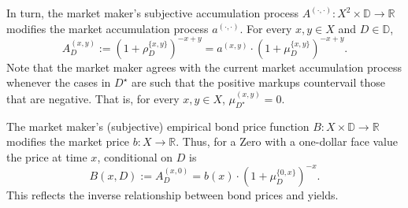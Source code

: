 \documentclass[ecta,nameyear,draft]{econsocart}
\newcommand{\R}{\mathbb R}
\newcommand{\mbbd}{{\mathds D}}
\newcommand{\past}{{D^\star}}
\newcommand{\xy}{{(x, y)}}
\newcommand{\dd}{{(\cdot,\cdot)}}
\theoremstyle{plain}
\theoremstyle{remark}
\begin{document}
In turn, the market maker's subjective accumulation process ${A^{\dd}}: X^2
\times \mbbd \rightarrow \R$ modifies the market accumulation process
$a^{\dd}$. For every $x, y \in X$ and $D \in\mbbd$,
\begin{equation*}
  {A}^{\xy}_{D} := \left(1 + \rho^{\{x,y\}}_{D}\right)^{-x + y} = a^{\xy} \cdot
  \left(1 + \mu^{\{x, y\}}_{D}\right)^{-x + y}.
\end{equation*}
Note that the market maker agrees with the current market accumulation process
whenever the cases in $\past$ are such that the positive markups countervail
those that are negative. That is, for every $x, y \in X$, ${\mu}^{\xy}_{\past}
= 0$.

The market maker's (subjective) empirical bond price function $B : X \times
\mbbd \rightarrow \R$ modifies the market price $b: X \rightarrow \R$. Thus,
for a Zero with a one-dollar face value the price at time $x$, conditional on
$D$ is 
\begin{equation*} B(x,D) := {A}^{(x, 0)}_{D} =
  b(x) \cdot \left( 1 + \mu^{\{0,x\}}_{D} \right)^{-x} .
\end{equation*}
This reflects the inverse relationship between bond prices and yields.  
\end{document}
